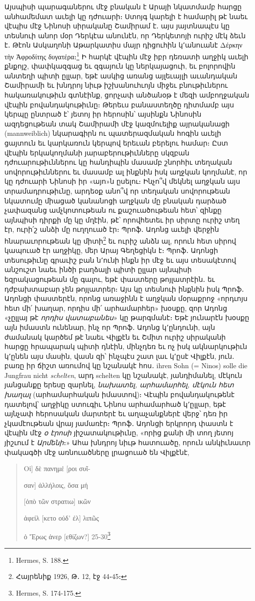 \documentclass{article}
\begin{document}
{Այսպիսի պարագաներու մէջ բնական է Արայի նկատմամբ հարցը անհամեմատ աւելի կը դժուարի։ Ստոյգ կարելի է համարիլ թէ նաեւ վէպիս մէջ Նինոսի սիրականը Շամիրամ է․ այս յայտնապէս կը տեսնուի անոր մօր Դերկէա անունէն, որ Դերկետոյի ուրիշ մէկ ձեւն է․ Թէոն Ասկաղոնի Աթարկատիս մայր դիցուհին կ՚անուանէ Δέρκην τὴν Ἀφροδίτης δυγατέρα։\footnote{Hermes, S. 188.} Ի հարկէ վէպին մէջ իբր դեռատի աղջիկ աւելի քնքոյշ, փափկազգաց եւ զգայուն կը ներկայացուի, եւ բոլորովին անտեղի պիտի ըլլար, եթէ ասկից առանց այլեւայլի աւանդական Շամիրամի եւ խնդրոյ նիւթ իշխանուհւոյն միջեւ բնութիւներու հակառակութիւն գտնէինք, ցորչափ անծանօթ է մեզի ամբողջական վէպին բովանդակութիւնը։ Թերեւս բանաստեղծը դիտմամբ այս կերպը ընտրած է՝ յետոյ իր հերոսին՝ այսինքն Նինոսին ազդեցութեան տակ Շամիրամի մէջ կազմուելիք այրականացի (mannweiblich) նկարագիրն ու պատերազմական հոգին աւելի ցայտուն եւ կարկառուն կերպով երեւան բերելու համար։ Ըստ վէպին երկակողմանի յարաբերութիւնները սկզբան դժուարութիւններու կը հանդիպին մասամբ շնորհիւ տեղական սովորութիւններու եւ մասամբ ալ ինքնին իսկ աղջկան կողմանէ, որ կը դժուարի Նինոսի իր «այո»ն ըսելու։ Ինչո՞վ մեկնել աղջկան այս տրամադրութիւնը, արդեօք անո՞վ որ տեղական սովորութեան նկատումը միացած կանանոցի աղջկան մը բնական դարձած չափազանց ամչկոտութեան ու քաշուածութեան հետ՝ զինքը այնպիսի դիրքի մը կը մղէին, թէ՝ որովհետեւ իր սիրտը ուրիշ տեղ էր, ուրի՛շ անձի մը ուղղուած էր։ Պրոֆ․ Ադոնց աւելի վերջին հնարաւորութեան կը միտի\footnote{Հայրենիք 1926, Թ․ 12, էջ 44֊45։} եւ ուրիշ անձն ալ, որուն հետ սիրով կապուած էր աղջիկը, մեր Արայ Գեղեցիկն է։ Պրոֆ․ Ադոնցի տեսութիւնը գրաւիշ բան ն՚ունի ինքն իր մէջ եւ այս տեսակէտով անշուշտ նաեւ ինծի բաղձալի պիտի ըլլար այնպիսի եզրակացութեան մը գալու, եթէ փաստերը թոյլատրէին․ եւ դժբախտաբար չեն թոյլատրեր։ Այս կը տեսնուի ինքնին իսկ Պրոֆ․ Ադոնցի փաստերէն, որոնց առաջինն է աղջկան մօրաքրոջ «որդւոյս հետ մի՛ խաղար, որդիս մի՛ արհամարհեր» խօսքը, զոր Ադոնց «չըլլայ թէ \emph{որդիս վատաբանես}» կը թարգմանէ։ Եթէ յունարէն խօսքը այն իմաստն ունենար, ինչ որ Պրոֆ․ Ադոնց կ՚ընդունի, այն ժամանակ կարծեմ թէ նաեւ Վիլքէն եւ Շմիտ ուրիշ սիրականի հարցը հրապարակ պիտի դնէին, մինչդեռ եւ ոչ իսկ ակնարկութիւն կ՚ընեն այս մասին, վասն զի՝ ինչպէս շատ լաւ կ՚ըսէ Վիլքէն, յուն․ բառը իր ճիշտ առումով կը նշանակէ հոս․ ihren Sohn (= Ninos) solle die Jungfrau nicht \emph{schelten}, արդ schelten կը նշանակէ, յանդիմանել, մէկուն յանցանքը երեսը զարնել, \emph{նախատել, արհամարհել, մէկուն հետ խաղալ} (արհամարհական իմաստով)։ Վէպին բովանդակութենէ դատելով՝ աղջիկը ստուգիւ Նինոս արհամարհած կ՚ըլլար, եթէ այնչափ հերոսական մարտերէ եւ աղաչանքներէ վերջ՝ դեռ իր չկամէութեան վրայ յամառէր։ Պրոֆ․ Ադոնցի երկրորդ փաստն է վէպին մէջ \emph{օ էրոսի} յիշատակութիւնը, «որից քանի մի տող յետոյ յիշւում է \emph{Արմենի}։» Ահա խնդրոյ նիւթ հատուածը, որուն անկիւնաւոր փակագծի մէջ առնուածները լրացուած են Վիլքէնէ,}
\begin{quotation}
\small
Οἱ] δὲ πανημέ [ροι συῖ-

σαν] ἀλλήλοις, ὅσα μή

[ὁπὸ τῶν στρατιω] ικῶν

ἀφείλ [κετο οὐδ' ἐλ] λιπῶς

ὁ Ἔρως ἀνερ [εθίζων?]  25-30\footnote{Hermes, S. 174-175.}
\end{quotation}
\end{document}
